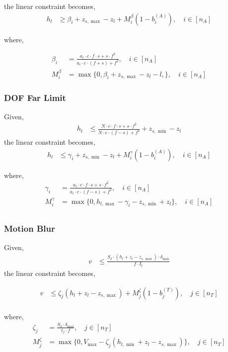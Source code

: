 \documentclass[11pt]{article}
\begin{document}
\noindent
the linear constraint becomes,
\begin{align}
  h_l &\geq \beta_i + z_{s,\max} - z_l + M^{\beta}_i(1-b_i^{(A)}), \quad i \in [n_A]
\end{align}

\noindent
where,

\begin{align}
  \beta_i &= \frac{a_i \cdot c \cdot f \cdot s + s \cdot f^2}{a_i \cdot c \cdot (f+s) + f^2}, \quad i \in [n_A]\\
  M^\beta_i &= \max\{0, \beta_i + z_{s,\max} - z_l - l,\}, \quad i \in [n_A]
\end{align}

\subsubsection{DOF Far Limit}
Given,
\begin{align}
  h_l &\leq \frac{N \cdot c \cdot f \cdot s + s \cdot f^2}{N \cdot c \cdot (f-s) + f^2} + z_{s,\min} - z_l 
\end{align}
\noindent
the linear constraint becomes,
\begin{align}
  h_l &\leq \gamma_i + z_{s,\min} - z_l + M^\gamma_i(1-b_i^{(A)}), \quad i \in [n_A]
\end{align}

\noindent
where,
\begin{align}
  \gamma_i &= \frac{a_i \cdot c \cdot f \cdot s + s \cdot f^2}{a_i \cdot c \cdot (f-s) + f^2}, \quad i \in [n_A] \\
  M^\gamma_i &= \max\{0, h_{l,\max} - \gamma_i - z_{s,\min}+ z_l\}, \quad i \in [n_A] \\
\end{align}

\subsubsection{Motion Blur}
Given,
\begin{align}
  v &\leq \frac{ S_\delta \cdot (h_l + z_l - z_{s,\max}) \cdot \delta_{\max}}{f \cdot I_t}
\end{align}
\noindent
the linear constraint becomes,

\begin{align}
  v &\leq \zeta_j(h_l + z_l-z_{s,\max}) + M_j^\zeta(1-b_j^{(T)}), \quad j \in [n_T]\\
\end{align}

\noindent
where,
\begin{align}
  \zeta_j &= \frac{S_\delta \cdot \delta_{\max}}{t_j \cdot f}, \quad j \in [n_T] \\
  M_j^\zeta &= \max\{0, V_{\max} - \zeta_j(h_{l,\min} + z_l - z_{s,\max})\}, \quad j \in [n_T]
\end{align}
\end{document}
